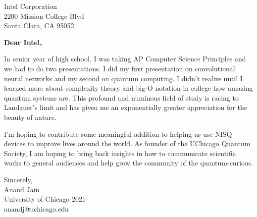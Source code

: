 \documentclass[11pt,a4paper]{letter} %
\begin{document}
\begin{letter}{Intel Corporation \\ 2200 Mission College Blvd \\ Santa Clara, CA  95052 } 

\opening{\textbf{Dear Intel,}}

In senior year of high school, I was taking AP Computer Science Principles and we had to do two presentations. I did my first presentation on convolutional neural networks and my second on quantum computing. 
I didn’t realize until I learned more about complexity theory and big-O notation in college how amazing quantum systems are. 
This profound and numinous field of study is racing to Landauer's limit and has given me an exponentially greater appreciation for the beauty of nature.

I'm hoping to contribute some meaningful addition to helping us use NISQ devices to improve lives around the world.
As founder of the UChicago Quantum Society, I am hoping to bring back insights in how to communicate scientific works to general audiences and help grow the community of the quantum-curious.


\closing{Sincerely, \\ Anand Jain \\ University of Chicago 2021 \\ anandj@uchicago.edu}

\end{letter}
 
\end{document}
